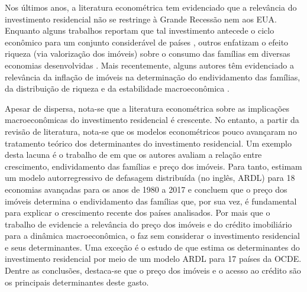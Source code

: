 Nos últimos anos, a literatura econométrica tem evidenciado que a relevância do investimento residencial não se restringe à Grande Recessão nem aos EUA. 
Enquanto alguns trabalhos reportam que tal investimento antecede o ciclo econômico para um conjunto considerável de países \cites{gauger_residential_2003}{huang_is_2018}, outros enfatizam o efeito riqueza (via valorização dos imóveis) sobre o consumo das famílias em diversas economias desenvolvidas \cite{de_bandt_housing_2010}. %
Mais recentemente, alguns autores têm evidenciado a relevância da inflação de imóveis na determinação do endividamento das famílias, da distribuição de riqueza e da estabilidade macroeconômica 
\cites{ryoo_household_2016}{stockhammer_debt-driven_2016}{barnes_private_2016}{johnston_global_2017}{mian_household_2017}{anderson_politics_2020}{fuller_housing_2020}.

Apesar de dispersa, nota-se que a literatura econométrica sobre as implicações macroeconômicas do investimento residencial é crescente.
No entanto,     a partir da revisão de literatura, nota-se que os modelos econométricos %
pouco avançaram no tratamento teórico dos determinantes do investimento residencial. 
Um exemplo desta lacuna é o trabalho de \textcite{wood_house_2020} em que os autores avaliam a relação entre crescimento, endividamento das famílias e preço dos imóveis.
Para tanto, estimam um modelo autorregressivo de defasagem distribuída (no inglês, ARDL)  para 18 economias avançadas para os anos de 1980 a 2017 e concluem que o preço dos imóveis determina o endividamento das famílias que, por sua vez, é fundamental para explicar o crescimento recente dos países analisados.
Por mais que o trabalho de \textcite{wood_house_2020} evidencie a relevância do preço dos imóveis e do crédito imobiliário para a dinâmica macroeconômica, o faz sem considerar o investimento residencial e seus determinantes. 
Uma exceção é o estudo de 
\textcite{arestis_residential_2015} que estima os determinantes do investimento residencial por meio de um modelo ARDL para 17 países da OCDE.  
Dentre as conclusões, destaca-se que o preço dos imóveis e o acesso ao crédito são os principais determinantes deste gasto.

